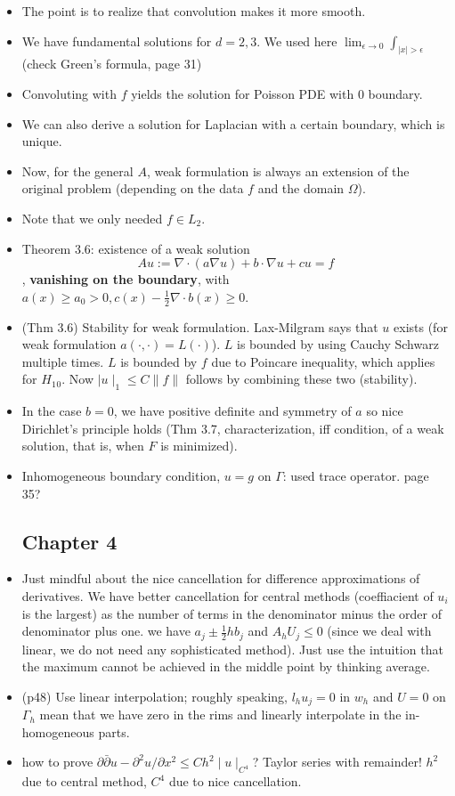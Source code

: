 \documentclass{article}
\theoremstyle{remark}
\begin{document}
\begin{itemize}
    \item The point is to realize that convolution makes it more smooth.
    \item We have fundamental solutions for $d=2,3$. We used here $\lim_{\epsilon\to 0}\int_{\mid x\mid>\epsilon}$ (check Green's formula, page 31)
    \item Convoluting with $f$ yields the solution for Poisson PDE with $0$ boundary.
    \item We can also derive a solution for Laplacian with a certain boundary, which is unique.
    \item Now, for the general $A$, weak formulation is always an extension of the original problem (depending on the data $f$ and the domain $\Omega$).
    \item Note that we only needed $f\in L_2$.
    \item Theorem 3.6: existence of a weak solution $$Au:=\nabla\cdot(a\nabla u)+b\cdot\nabla u+cu=f$$, \textbf{vanishing on the boundary}, with $a(x)\geq a_0>0, c(x)-\frac 12\nabla\cdot b(x)\geq 0$.
    \item (Thm 3.6) Stability for weak formulation. Lax-Milgram says that $u$ exists (for weak formulation $a(\cdot,\cdot)=L(\cdot)$). $L$ is bounded by using Cauchy Schwarz multiple times. $L$ is bounded by $f$ due to Poincare inequality, which applies for $H_1{_0}$. Now $\mid u\mid_1\leq C\lVert f\rVert$ follows by combining these two (stability).
    \item In the case $b=0$, we have positive definite and symmetry of $a$ so nice Dirichlet's principle holds (Thm 3.7, characterization, iff condition, of a weak solution, that is, when $F$ is minimized).
    \item Inhomogeneous boundary condition, $u=g$ on $\Gamma$: used trace operator. page 35?
    \subsection*{Chapter 4}
    \item Just mindful about the nice cancellation for difference approximations of derivatives. We have better cancellation for central methods (coeffiacient of $u_i$ is the largest) as the number of terms in the denominator minus the order of denominator plus one. we have $a_j\pm \frac 12 hb_j$ and $A_hU_j\leq 0$ (since we deal with linear, we do not need any sophisticated method). Just use the intuition that the maximum cannot be achieved in the middle point by thinking average.
    \item (p48) Use linear interpolation; roughly speaking, $l_h u_j=0$ in $w_h$ and $U=0$ on $\Gamma_h$ mean that we have zero in the rims and linearly interpolate in the in-homogeneous parts.
    \item how to prove $\partial\bar\partial u-\partial^2 u/\partial x^2\leq Ch^2\mid u\mid_{C^4}$? Taylor series with remainder! $h^2$ due to central method, $C^4$ due to nice cancellation.
    

\end{itemize}
\end{document}
